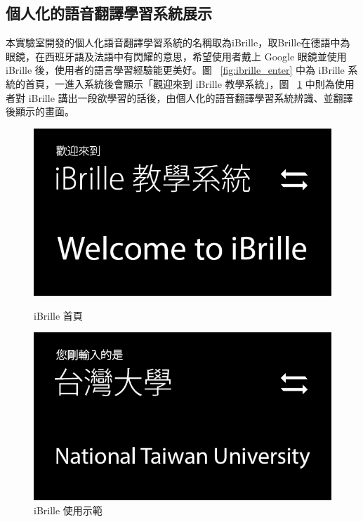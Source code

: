 \subsection{個人化的語音翻譯學習系統展示}
本實驗室開發的個人化語音翻譯學習系統的名稱取為iBrille，取Brille在德語中為眼鏡，在西班牙語及法語中有閃耀的意思，希望使用者戴上 Google 眼鏡並使用 iBrille 後，使用者的語言學習經驗能更美好。圖 ~\ref{fig:ibrille_enter} 中為 iBrille 系統的首頁，一進入系統後會顯示「觀迎來到 iBrille 教學系統」，圖 ~\ref{fig:ibrille_example} 中則為使用者對 iBrille 講出一段欲學習的話後，由個人化的語音翻譯學習系統辨識、並翻譯後顯示的畫面。
\begin{figure}
\centering
\includegraphics[scale=0.3]{images/glass/ibrille_enter.png}
\caption{iBrille 首頁} \label{fig:ibrille_enter}
\centering
\includegraphics[scale=0.3]{images/glass/ibrille_example.png}
\caption{iBrille 使用示範} \label{fig:ibrille_example}
\end{figure}

